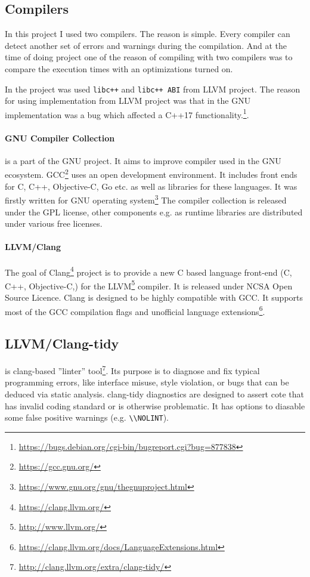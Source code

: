 \subsection{Compilers}
\label{subsec:compilers}
In this project I used two compilers. The reason is simple.
Every compiler can detect another set of errors and warnings during the compilation.
And at the time of doing project one of the reason of compiling with two compilers
was to compare the execution times with an optimizations turned on.

In the project was used \texttt{libc++} and \texttt{libc++ ABI} from LLVM project.
The reason for using implementation from LLVM project was that in the GNU implementation
was a bug which affected a C++17 functionality.\footnote{\url{https://bugs.debian.org/cgi-bin/bugreport.cgi?bug=877838}}.

\paragraph{GNU Compiler Collection} is a part of the GNU project.
It aims to improve compiler used in the GNU ecosystem.
GCC\footnote{\url{https://gcc.gnu.org/}} uses an open development environment.
It includes front ends for C, C++, Objective-C, Go etc.
as well as libraries for these languages. It was firstly written for GNU operating system\footnote{\url{https://www.gnu.org/gnu/thegnuproject.html}}
The compiler collection is released under the GPL license, other components e.g. as runtime libraries are distributed under various free licenses.

\paragraph{LLVM/Clang}
The goal of Clang\footnote{\url{https://clang.llvm.org/}} project is to provide a new C based language front-end (C, C++, Objective-C,) for the LLVM\footnote{\url{http://www.llvm.org/}} compiler.
It is released under NCSA Open Source Licence. Clang is designed to be highly compatible with GCC.
It supports most of the GCC compilation flags and unofficial language extensions\footnote{\url{https://clang.llvm.org/docs/LanguageExtensions.html}}.

\subsection{LLVM/Clang-tidy} is clang-based ''linter'' tool\footnote{\url{http://clang.llvm.org/extra/clang-tidy/}}.
Its purpose is to diagnose and fix typical programming errors,
like interface misuse, style violation, or bugs that can be deduced via static analysis.
clang-tidy diagnostics are designed to assert cote that has invalid coding standard or is otherwise problematic.
It has options to diasable some false positive warnings (e.g. \texttt{\textbackslash\textbackslash NOLINT}).

